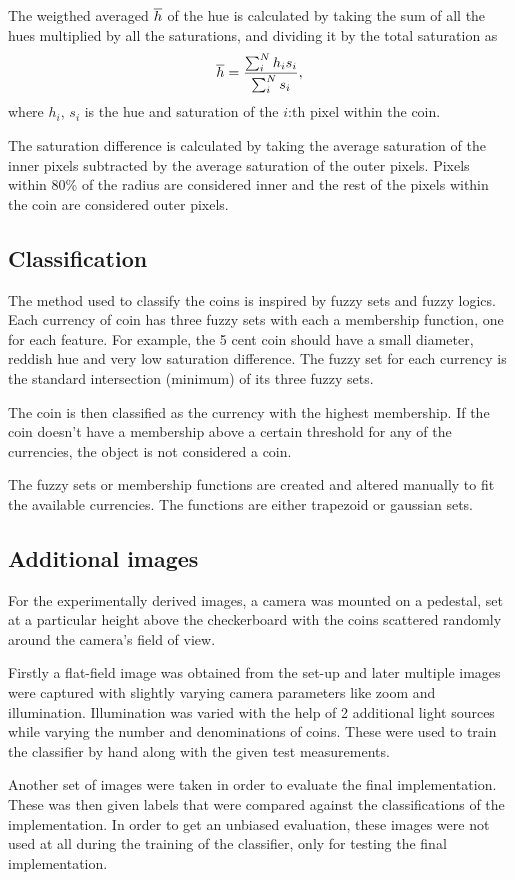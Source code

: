 \documentclass[report.tex]{subfile}
\begin{document}
The weigthed averaged $\overline{h}$ of the hue is calculated by taking the sum of
all the hues multiplied by all the saturations, and dividing it by the total
saturation as
\begin{equation*}
    \overline{h} = \frac{\sum_i^N h_i s_i}{\sum_i^N s_i},
\end{equation*}
where $h_i$, $s_i$ is the hue and saturation of the $i$:th pixel within the
coin.

The saturation difference is calculated by taking the average saturation of the
inner pixels subtracted by the average saturation of the outer pixels. Pixels
within 80\% of the radius are considered inner and the rest of the pixels
within the coin are considered outer pixels.

\subsection{Classification}
The method used to classify the coins is inspired by fuzzy sets and fuzzy
logics. Each currency of coin has three fuzzy sets with each a membership
function, one for each feature. For example, the 5 cent coin should have a
small diameter, reddish hue and very low saturation difference. The fuzzy set
for each currency is the standard intersection (minimum) of its three fuzzy
sets.

The coin is then classified as the currency with the highest membership. If the
coin doesn't have a membership above a certain threshold for any of the
currencies, the object is not considered a coin.

The fuzzy sets or membership functions are created and altered manually to fit
the available currencies. The functions are either trapezoid or gaussian sets.

\subsection{Additional images}
For the experimentally derived images, a camera was mounted on a pedestal, set
at a particular height above the checkerboard with the coins scattered randomly
around the camera's field of view.

Firstly a flat-field image was obtained from the set-up and later multiple
images were captured with slightly varying camera parameters like zoom and
illumination. Illumination was varied with the help of 2 additional light
sources while varying the number and denominations of coins. These were used to
train the classifier by hand along with the given test measurements.

Another set of images were taken in order to evaluate the final implementation.
These was then given labels that were compared against the classifications of
the implementation. In order to get an unbiased evaluation, these images were
not used at all during the training of the classifier, only for testing the
final implementation.
\end{document}

